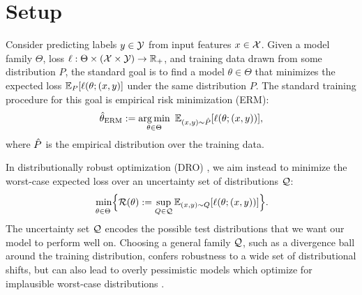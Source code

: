 \section{Setup}\label{sec:setup}

Consider predicting labels $y \in \mathcal{Y}$ from input features $x \in \mathcal{X}$.
Given a model family $\Theta$,
loss $\ell: \Theta \times (\mathcal{X} \times \mathcal{Y}) \to \mathbb{R}_+$,
and training data drawn from some distribution $P$,
the standard goal is to find a model $\theta \in \Theta$ that minimizes the expected loss $\mathbb{E}_P[\ell(\theta; (x, y)]$ under the same distribution $P$.
The standard training procedure for this goal is empirical risk minimization (ERM):
\begin{align}\label{eqn:hterm}
  {\hat\theta_{\text{ERM}}} := \operatorname*{arg\,min}_{\theta \in \Theta} \ \mathbb{E}_{(x, y) \sim {\hat{P}}}[\ell(\theta; (x, y))],
\end{align}
where ${\hat{P}}$ is the empirical distribution over the training data.

In distributionally robust optimization (DRO) \citep{bental2013robust, duchi2016}, we aim instead to minimize the worst-case expected loss over
an uncertainty set of distributions $\mathcal{Q}$:
\begin{align}\label{eq:dro}
  \underset{\theta \in \Theta}{\vphantom{\sup}\min} \Bigl\{ \mathcal{R}(\theta) := \sup_{Q \in \mathcal{Q}} \mathbb{E}_{(x, y) \sim Q}[\ell(\theta; (x, y))] \Bigr\}.
\end{align}
The uncertainty set $\mathcal{Q}$ encodes the possible test distributions that we want our model to perform well on.
Choosing a general family $\mathcal{Q}$, such as a divergence ball around the training distribution,
confers robustness to a wide set of distributional shifts,
but can also lead to overly pessimistic models which optimize for implausible worst-case distributions
\citep{duchi2019distributionally}.

